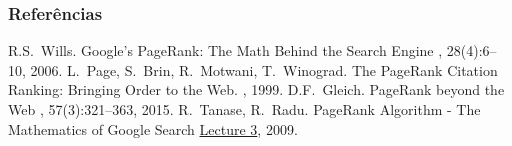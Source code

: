 \documentclass{beamer}
\begin{document}
\begin{frame}
    \frametitle{Referências}
    \begin{thebibliography}{10}
  \beamertemplatearticlebibitems
    R.S.~Wills.
    \newblock Google’s PageRank: The Math Behind the Search Engine
    , 28(4):6--10, 2006.
  \beamertemplatearticlebibitems
    L.~Page, S.~Brin, R.~Motwani, T.~Winograd.
    \newblock The PageRank Citation Ranking: Bringing Order to the Web.
    , 1999.
  \beamertemplatearticlebibitems
    D.F.~Gleich.
    \newblock PageRank beyond the Web
    , 57(3):321--363, 2015.
  \beamertemplateonlinebibitems
    R.~Tanase, R.~Radu.
    \newblock PageRank Algorithm - The Mathematics of Google Search
    \newblock
    \href{http://www.math.cornell.edu/~mec/Winter2009/RalucaRemus/Lecture3/lecture3.html}
    {Lecture 3}, 2009.
  \end{thebibliography}
\end{frame}
\end{document}
